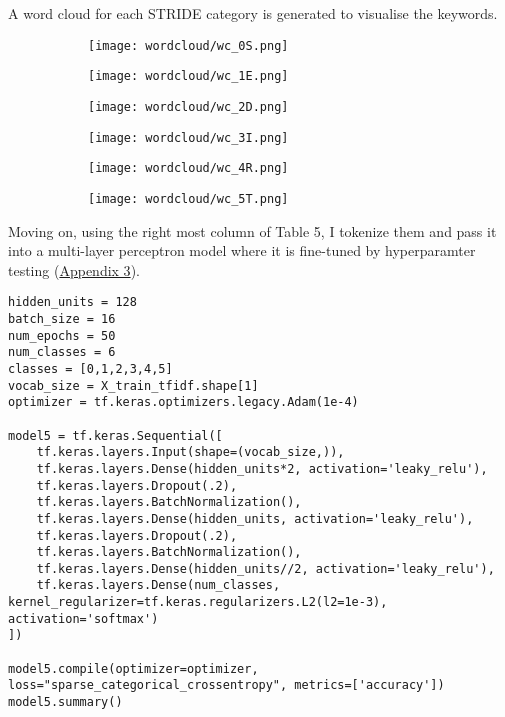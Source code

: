 A word cloud for each STRIDE category is generated to visualise the keywords.
\begin{figure}[h]
    \centering
    \begin{subfigure}{0.45\textwidth}
        \texttt{[image: wordcloud/wc\_0S.png]}
    \end{subfigure}
    \hfill
    \begin{subfigure}{0.45\textwidth}
        \texttt{[image: wordcloud/wc\_1E.png]}
    \end{subfigure}
    
    \medskip
    
    \begin{subfigure}{0.45\textwidth}
        \texttt{[image: wordcloud/wc\_2D.png]}
    \end{subfigure}
    \hfill
    \begin{subfigure}{0.45\textwidth}
        \texttt{[image: wordcloud/wc\_3I.png]}
    \end{subfigure}
    
    \medskip
    
    \begin{subfigure}{0.45\textwidth}
        \texttt{[image: wordcloud/wc\_4R.png]}
    \end{subfigure}
    \hfill
    \begin{subfigure}{0.45\textwidth}
        \texttt{[image: wordcloud/wc\_5T.png]}
    \end{subfigure}
    \label{fig:grid}
\end{figure}

Moving on, using the right most column of Table 5, I tokenize them and pass it into a multi-layer perceptron model where it is fine-tuned by hyperparamter testing (\hyperref[subsec:appendix3]{Appendix 3}). \\
\begin{lstlisting}[frame=single]
hidden_units = 128
batch_size = 16
num_epochs = 50
num_classes = 6
classes = [0,1,2,3,4,5]
vocab_size = X_train_tfidf.shape[1]
optimizer = tf.keras.optimizers.legacy.Adam(1e-4)

model5 = tf.keras.Sequential([
    tf.keras.layers.Input(shape=(vocab_size,)),
    tf.keras.layers.Dense(hidden_units*2, activation='leaky_relu'),
    tf.keras.layers.Dropout(.2),
    tf.keras.layers.BatchNormalization(),
    tf.keras.layers.Dense(hidden_units, activation='leaky_relu'),
    tf.keras.layers.Dropout(.2),
    tf.keras.layers.BatchNormalization(),
    tf.keras.layers.Dense(hidden_units//2, activation='leaky_relu'),
    tf.keras.layers.Dense(num_classes, kernel_regularizer=tf.keras.regularizers.L2(l2=1e-3), activation='softmax')
])

model5.compile(optimizer=optimizer, loss="sparse_categorical_crossentropy", metrics=['accuracy'])
model5.summary()
\end{lstlisting}

